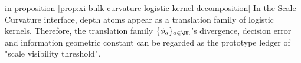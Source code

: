 %

in proposition \ref{prop:xi-bulk-curvature-logistic-kernel-decomposition} In the Scale Curvature interface, depth atoms appear as a translation family of logistic kernels.
Therefore, the translation family \(\{\phi_a\}_{a\in\RR}\)'s divergence, decision error and information geometric constant can be regarded as the prototype ledger of "scale visibility threshold".

